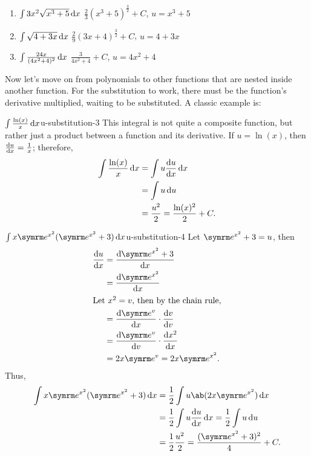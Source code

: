 \begin{enumerate}
  \item $\int 3x^2\sqrt{x^3 + 5}\odif{x}$ \hfill $\frac{2}{3}(x^3 + 5)^{\frac{3}{2}} + C$, $u = x^3 + 5$
  \item $\int \sqrt{4 + 3x}\odif{x}$ \hfill $\frac{2}{9}(3x + 4)^{\frac{3}{2}} + C$, $u = 4 + 3x$
  \item $\int \frac{24x}{(4x^2 + 4)^2}\odif{x}$ \hfill $\frac{3}{4x^2 + 4} + C$, $u = 4x^2 + 4$
\end{enumerate}

Now let's move on from polynomials to other functions that are nested inside another function. For the substitution to work, there must be the function's derivative multiplied, waiting to be substituted. A classic example is:
\begin{exmp}{$\int \frac{\ln(x)}{x}\odif{x}$}{u-substitution-3}
  This integral is not quite a composite function, but rather just a product between a function and its derivative. If $u = \ln(x)$, then $\odv{u}{x} = \frac{1}{x}$; therefore,
  \begin{align}
    \int \frac{\ln(x)}{x}\odif{x} & = \int u\odv{u}{x}\odif{x}                 \\
                                  & = \int u\odif{u}                           \\
                                  & = \frac{u^2}{2} = \frac{\ln(x)^2}{2} + C.
  \end{align}
\end{exmp}

\begin{exmp}{$\int x\e^{x^2}(\e^{x^2} + 3)\odif{x}$}{u-substitution-4}
  Let $\e^{x^2} + 3 = u$, then
  \begin{align}
    \odv{u}{x} & = \odv{\e^{x^2} + 3}{x}            \\
               & = \odv{\e^{x^2}}{x}                \\
    \intertext{Let $x^2 = v$, then by the chain rule,}
               & = \odv{\e^v}{x} \cdot \odv{v}{v}   \\
               & = \odv{\e^v}{v} \cdot \odv{x^2}{x} \\
               & = 2x\e^v = 2x\e^{x^2}.
  \end{align}
  Thus,
  \begin{align}
    \int x\e^{x^2}(\e^{x^2} + 3)\odif{x} & = \frac{1}{2}\int u\ab(2x\e^{x^2})\odif{x}                        \\
                                         & = \frac{1}{2}\int u\odv{u}{x}\odif{x} = \frac{1}{2}\int u\odif{u} \\
                                         & = \frac{1}{2}\frac{u^2}{2} = \frac{(\e^{x^2} + 3)^2}{4} + C.
  \end{align}
\end{exmp}

